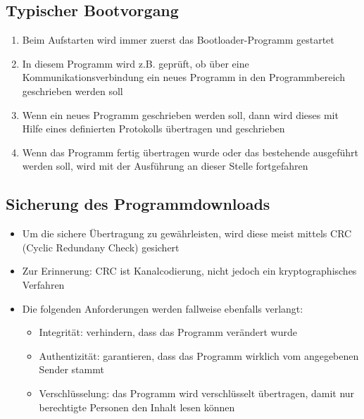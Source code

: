 \subsection{Typischer Bootvorgang}
\begin{enumerate}
  \item Beim Aufstarten wird immer zuerst das Bootloader-Programm gestartet
  \item In diesem Programm wird z.B. geprüft, ob über eine Kommunikationsverbindung ein neues Programm in den Programmbereich geschrieben werden soll
  \item Wenn ein neues Programm geschrieben werden soll, dann wird dieses mit Hilfe eines definierten Protokolls übertragen und geschrieben
  \item Wenn das Programm fertig übertragen wurde oder das bestehende ausgeführt werden soll, wird mit der Ausführung an dieser Stelle fortgefahren
\end{enumerate}

\subsection{Sicherung des Programmdownloads}
\begin{itemize}
  \item Um die sichere Übertragung zu gewährleisten, wird diese meist mittels CRC (Cyclic Redundany Check) gesichert
  \item Zur Erinnerung: CRC ist Kanalcodierung, nicht jedoch ein kryptographisches Verfahren
  \item Die folgenden Anforderungen werden fallweise ebenfalls verlangt:
  \begin{itemize}
    \item Integrität: verhindern, dass das Programm verändert wurde
    \item Authentizität: garantieren, dass das Programm wirklich vom angegebenen Sender stammt
    \item Verschlüsselung: das Programm wird verschlüsselt übertragen, damit nur berechtigte Personen den Inhalt lesen können
  \end{itemize}
\end{itemize}
